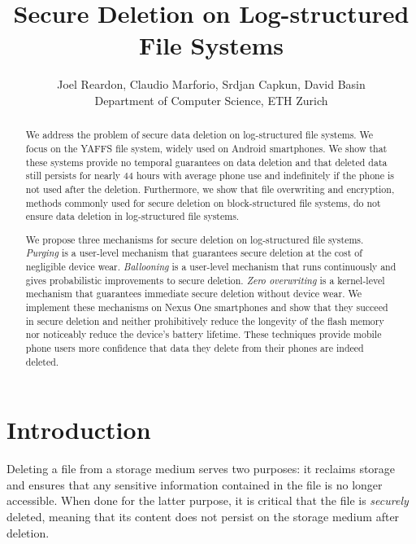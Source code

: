 \documentclass{acmtog}
\begin{document}
\title{Secure Deletion on Log-structured File Systems}
\author{
Joel Reardon, Claudio Marforio, Srdjan Capkun, David Basin \\
Department of Computer Science, ETH Zurich}
\maketitle





\begin{abstract}
We address the problem of secure data deletion on log-structured file systems.
We focus on the YAFFS file system, widely used on  Android smartphones. 
We show that these systems provide no temporal guarantees on data deletion and 
that deleted data still persists for nearly  
44 hours with average phone use and 
indefinitely if the phone is not used after the deletion.
Furthermore, we show that file overwriting and encryption, methods commonly used for
secure deletion on block-structured file systems, 
do not ensure data deletion in log-structured file systems.

We propose three mechanisms for secure deletion on log-structured file
systems. \emph{Purging} is a user-level mechanism that guarantees secure deletion at the cost
of negligible device wear. \emph{Ballooning} is a user-level mechanism that
runs continuously and gives probabilistic improvements to secure deletion.  
\emph{Zero overwriting} is  a kernel-level mechanism that guarantees immediate secure
deletion without device wear. 
We implement these mechanisms on Nexus One smartphones and show that they
succeed in secure deletion and 
neither prohibitively 
reduce the longevity of the flash memory nor noticeably reduce the device's
battery lifetime. These techniques provide mobile phone 
users more confidence that data
they delete from their phones are indeed deleted.



\end{abstract}

\section{Introduction}
Deleting a file from a storage medium serves two  purposes: it
reclaims storage and ensures that any sensitive information
contained in the file is no longer accessible. When done for the
latter purpose, it is critical that the file is \emph{securely} deleted,
meaning that its content does not persist on the storage medium after
deletion.
\end{document}
